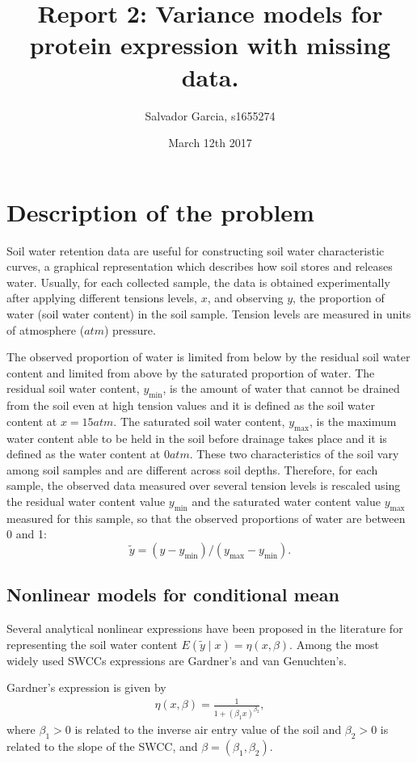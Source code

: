 \documentclass{article}
\author{Salvador Garcia, s1655274}
\date{March 12th 2017}
\title{Report 2: Variance models for protein expression with missing data.}
\begin{document}
\maketitle

\section{Description of the problem} 

Soil water retention data are useful for constructing soil water characteristic curves, a graphical representation which describes how soil stores and releases water. Usually, for each collected sample, the data is obtained experimentally after applying different tensions levels, $x$, and observing $y$, the  proportion of water (soil water content) in the soil sample. Tension levels are measured in units of atmosphere ($atm$) pressure.

The observed proportion of water is limited from below by the residual soil water content and limited from above by the saturated proportion of water.  The residual soil water content, $y_{\min}$, is the amount of water that cannot be drained from the soil even at high tension values and it is defined as the soil water content at $x=15atm$. The saturated soil water content, $y_{\max}$, is the maximum water content able to be held in the soil before drainage takes place and it is defined as the water content at $0atm$. These two characteristics of the soil vary among soil samples and are different across soil depths. Therefore, for each sample, the observed data measured over several tension levels is rescaled using the residual water content value $y_{\min}$ and the saturated water content value $y_{\max}$ measured for this sample, so that the observed proportions of water are between 0 and 1:
 $$
 \tilde y = (y-y_{\min})/(y_{\max}-y_{\min}).
 $$

\subsection*{Nonlinear models for conditional mean}

Several analytical nonlinear expressions have been proposed in the literature for representing the soil water content $E (\tilde y \mid x)= \eta \left(x, \beta\right)$. Among the most widely used SWCCs expressions are Gardner's and van Genuchten's.

Gardner's expression  is given by
\begin{eqnarray}
\label{ga}
\eta \left(x, \beta \right)  = \frac{1}{1 + (\beta_1 x)^{\beta_2}},
\label{gardner}
\end{eqnarray}
where $\beta_1>0$ is related to the inverse air entry value of the soil and $\beta_2>0$ is related to the slope of the SWCC, and $\beta=(\beta_1,\beta_2)$.
\end{document}
